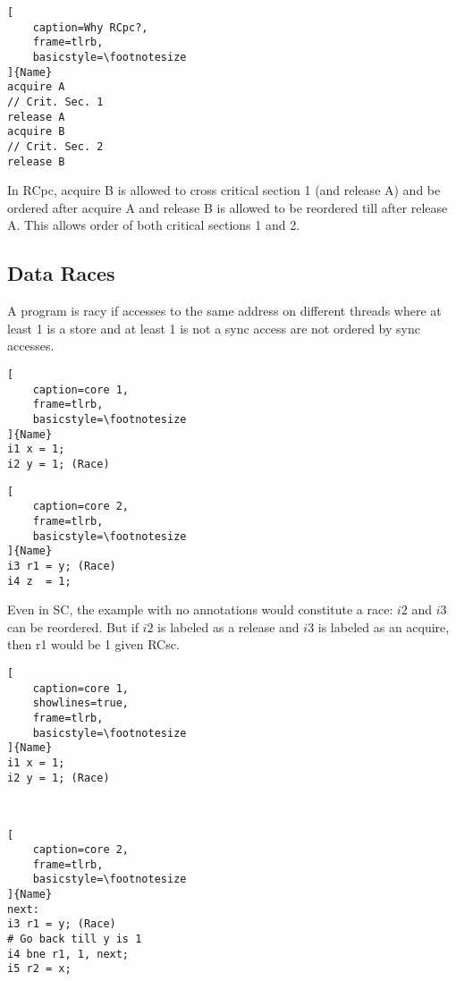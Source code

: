 \documentclass{article}
\begin{document}
\begin{multicols*}{2}
\begin{lstlisting}[
    caption=Why RCpc?,
    frame=tlrb,
    basicstyle=\footnotesize
]{Name}
acquire A
// Crit. Sec. 1
release A
acquire B
// Crit. Sec. 2
release B
\end{lstlisting}

\noindent\newline
In RCpc, acquire B is allowed to cross critical section 1 (and release A) and be ordered after acquire A and release B is allowed to be reordered till after release A. This allows order of both critical sections 1 and 2.

\subsection{Data Races}
A program is racy if accesses to the same address on different threads where at least 1 is a store and at least 1 is not a sync access are not ordered by sync accesses.

\noindent\begin{minipage}{.2\textwidth}
\captionsetup{labelformat=empty}
\begin{lstlisting}[
    caption=core 1,
    frame=tlrb, 
    basicstyle=\footnotesize
]{Name}
i1 x = 1;
i2 y = 1; (Race)
\end{lstlisting}
\end{minipage}\hfill
\begin{minipage}{.2\textwidth}
\captionsetup{labelformat=empty}
\begin{lstlisting}[
    caption=core 2,
    frame=tlrb,
    basicstyle=\footnotesize
]{Name}
i3 r1 = y; (Race)
i4 z  = 1;
\end{lstlisting}
\end{minipage}

\noindent\newline
Even in SC, the example with no annotations would constitute a race: $i2$ and $i3$ can be reordered. But if $i2$ is labeled as a release and $i3$ is labeled as an acquire, then r1 would be 1 given RCsc.

\noindent\begin{minipage}{.2\textwidth}
\captionsetup{labelformat=empty}
\begin{lstlisting}[
    caption=core 1,
    showlines=true,
    frame=tlrb, 
    basicstyle=\footnotesize
]{Name}
i1 x = 1;
i2 y = 1; (Race)



\end{lstlisting}
\end{minipage}\hfill
\begin{minipage}{.24\textwidth}
\captionsetup{labelformat=empty}
\begin{lstlisting}[
    caption=core 2,
    frame=tlrb,
    basicstyle=\footnotesize
]{Name}
next:
i3 r1 = y; (Race)
# Go back till y is 1
i4 bne r1, 1, next;
i5 r2 = x;
\end{lstlisting}
\end{minipage}


\end{multicols*}
\end{document}
